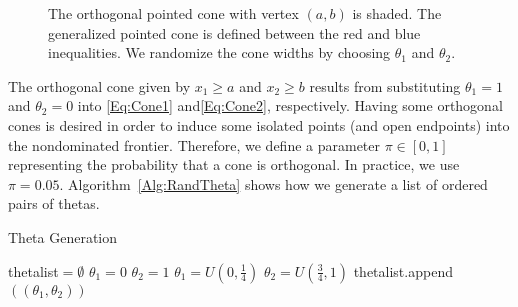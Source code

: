 \documentclass[11pt]{article} %
\begin{document}
\begin{figure}[t!]
\scriptsize
\begin{center}
\caption{The orthogonal pointed cone with vertex $(a,b)$ is shaded. The generalized pointed cone is defined between the red and blue inequalities. We randomize the cone widths by choosing $\theta_1$ and $\theta_2$.\label{Fig:PointedCone}}
\end{center}
\end{figure}

The orthogonal cone given by $x_1 \geq a$ and $x_2 \geq b$ results from substituting $\theta_1=1$ and $\theta_2=0$ into \eqref{Eq:Cone1} and\eqref{Eq:Cone2}, respectively. Having some orthogonal cones is desired in order to induce some isolated points (and open endpoints) into the nondominated frontier. Therefore, we define a parameter $\pi\in[0,1]$ representing the probability that a cone is orthogonal. In practice, we use $\pi=0.05$. Algorithm~\ref{Alg:RandTheta} shows how we generate a list of ordered pairs of thetas. 

\begin{algorithm}[H]
	\caption{Theta Generation}\label{Alg:RandTheta}
	\small
	\begin{algorithmic}[1]
		\STATE thetalist$=\emptyset$
		\STATE $\theta_1 = 0$
		\STATE $\theta_2 = 1$
		\ELSE
		\STATE $\theta_1 = U(0,\frac{1}{4})$
		\STATE $\theta_2 = U(\frac{3}{4},1)$
		\ENDIF 
		\STATE thetalist.append$\left( (\theta_1,\theta_2) \right)$
		\ENDFOR
	\end{algorithmic}
\end{algorithm}
\end{document}
